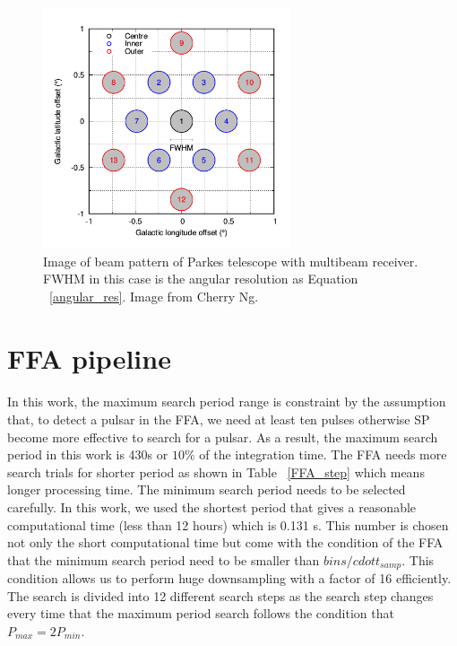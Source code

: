 \documentclass[thesis_msc.tex]{subfiles}
\begin{document}
\begin{figure}[h!]
\centering
\includegraphics[width=0.650\textwidth]{figures/beampattern}
\caption{Image of beam pattern of Parkes telescope with multibeam receiver. FWHM in this case is the angular resolution as Equation ~\ref{angular_res}. Image from Cherry Ng.}\label{HTRU_beam}
\end{figure}

\section{FFA pipeline}
\paragraph{} In this work, the maximum search period range is constraint by the assumption that, to detect a pulsar in the FFA, we need at least ten pulses otherwise SP become more effective to search for a pulsar. As a result, the maximum search period in this work is 430s or $10\%$ of the integration time. The FFA needs more search trials for shorter period as shown in Table ~\ref{FFA_step} which means longer processing time. The minimum search period needs to be selected carefully. In this work, we used the shortest period that gives a reasonable computational time (less than 12 hours) which is 0.131 s. This number is chosen not only the short computational time but come with the condition of the FFA that the minimum search period need to be smaller than $bins /cdot t_{samp}$. This condition allows us to perform huge downsampling with a factor of 16 efficiently. The search is divided into 12 different search steps as the search step changes every time that the maximum period search follows the condition that $P_{max}=2 P_{min}$.       
\end{document}
